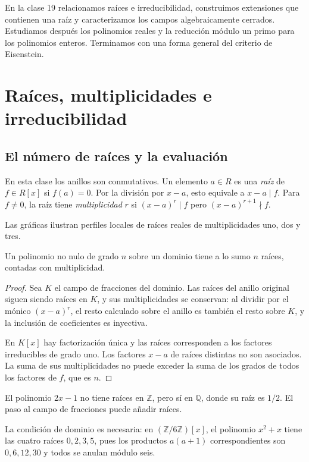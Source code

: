 En la clase 19 relacionamos raíces e irreducibilidad, construimos extensiones que contienen una raíz y caracterizamos los campos algebraicamente cerrados. Estudiamos después los polinomios reales y la reducción módulo un primo para los polinomios enteros. Terminamos con una forma general del criterio de Eisenstein.

\section{Raíces, multiplicidades e irreducibilidad}
\subsection{El número de raíces y la evaluación}
En esta clase los anillos son conmutativos. Un elemento $a\in R$ es una \emph{raíz} de $f\in R[x]$ si $f(a)=0$. Por la división por $x-a$, esto equivale a $x-a\mid f$. Para $f\ne0$, la raíz tiene \emph{multiplicidad} $r$ si $(x-a)^r\mid f$ pero $(x-a)^{r+1}\nmid f$.

Las gráficas ilustran perfiles locales de raíces reales de multiplicidades uno, dos y tres.


\begin{lema}\label{lema:C19-numero-raices}
Un polinomio no nulo de grado $n$ sobre un dominio tiene a lo sumo $n$ raíces, contadas con multiplicidad.
\end{lema}
\begin{proof}
Sea $K$ el campo de fracciones del dominio. Las raíces del anillo original siguen siendo raíces en $K$, y sus multiplicidades se conservan: al dividir por el mónico $(x-a)^r$, el resto calculado sobre el anillo es también el resto sobre $K$, y la inclusión de coeficientes es inyectiva.

En $K[x]$ hay factorización única y las raíces corresponden a los factores irreducibles de grado uno. Los factores $x-a$ de raíces distintas no son asociados. La suma de sus multiplicidades no puede exceder la suma de los grados de todos los factores de $f$, que es $n$.
\end{proof}
\begin{ejem}
El polinomio $2x-1$ no tiene raíces en $\mathbb Z$, pero sí en $\mathbb Q$, donde su raíz es $1/2$. El paso al campo de fracciones puede añadir raíces.

La condición de dominio es necesaria: en $(\mathbb Z/6\mathbb Z)[x]$, el polinomio $x^2+x$ tiene las cuatro raíces $0,2,3,5$, pues los productos $a(a+1)$ correspondientes son $0,6,12,30$ y todos se anulan módulo seis.
\end{ejem}

